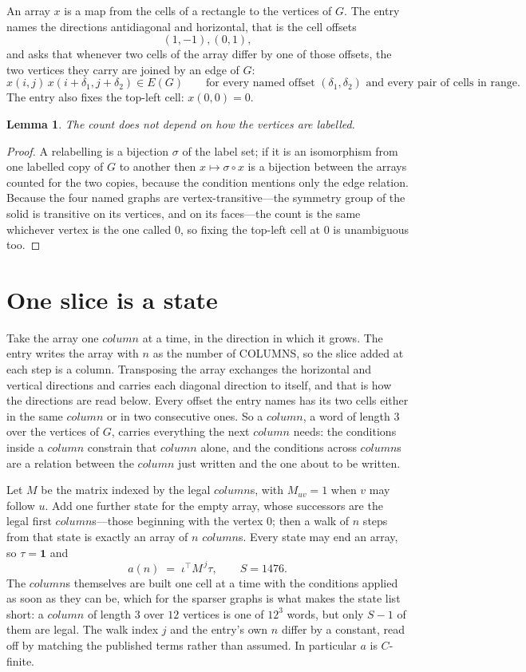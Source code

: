 \documentclass[11pt,a4paper]{article}
\theoremstyle{plain}
\newtheorem{lemma}[theorem]{Lemma}
\theoremstyle{definition}
\begin{document}
An array $x$ is a map from the cells of a rectangle to the vertices of $G$. The entry names the
directions antidiagonal and horizontal, that is the cell offsets
\[
(1,-1), (0,1),
\]
and asks that whenever two cells of the array differ by one of those offsets, the two vertices
they carry are joined by an edge of $G$:
\[
x(i,j)\,x(i+\delta_1,j+\delta_2)\in E(G)\qquad
\text{for every named offset } (\delta_1,\delta_2)\text{ and every pair of cells in range.}
\]
The entry also fixes the top-left cell: $x(0,0)=0$.

\begin{lemma}\label{lem:label}
The count does not depend on how the vertices are labelled.
\end{lemma}

\begin{proof}
A relabelling is a bijection $\sigma$ of the label set; if it is an isomorphism from one
labelled copy of $G$ to another then $x\mapsto\sigma\circ x$ is a bijection between the arrays
counted for the two copies, because the condition mentions only the edge relation.
Because the four named graphs are vertex-transitive---the symmetry group of the solid is transitive on its vertices, and on its faces---the count is the same whichever vertex is the one called $0$, so fixing the top-left cell at $0$ is unambiguous too.
\end{proof}

\section{One slice is a state}

Take the array one $column$ at a time, in the direction in which it grows. The entry writes the array with $n$ as the number of COLUMNS, so the slice added at each step is a column. Transposing the array exchanges the horizontal and vertical directions and carries each diagonal direction to itself, and that is how the directions are read below.
Every offset the entry names has its two cells either in the same $column$ or in two
consecutive ones. So a $column$, a word of length $3$ over the vertices of $G$, carries
everything the next $column$ needs: the conditions inside a $column$ constrain that
$column$ alone, and the conditions across $column$s are a relation between the
$column$ just written and the one about to be written.

Let $M$ be the matrix indexed by the legal $column$s, with $M_{uv}=1$ when $v$ may
follow $u$. Add one further state for the empty array, whose successors are the legal first
$column$s---those beginning with the vertex $0$; then a walk of
$n$ steps from that state is exactly an array of $n$ $column$s. Every state may end an
array, so $\tau=\mathbf{1}$ and
\[
a(n)\;=\;\iota^{\!\top}M^{\,j}\tau ,\qquad S=1476.
\]
The $column$s themselves are built one cell at a time with the conditions applied as soon
as they can be, which for the sparser graphs is what makes the state list short: a $column$
of length $3$ over $12$ vertices is one of $12^{3}$ words, but only $S-1$ of them are
legal. The walk index $j$ and the entry's own $n$ differ by a constant, read off by matching the
published terms rather than assumed. In particular $a$ is $C$-finite.
\end{document}
